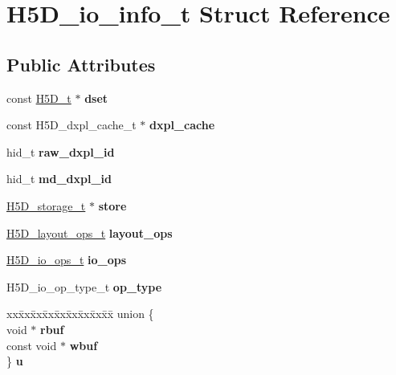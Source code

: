 \hypertarget{struct_h5_d__io__info__t}{}\section{H5\+D\+\_\+io\+\_\+info\+\_\+t Struct Reference}
\label{struct_h5_d__io__info__t}
\subsection*{Public Attributes}
\begin{DoxyCompactItemize}
\item 
\mbox{\label{struct_h5_d__io__info__t_a8b7c6ac8eb475f4453056d4341ca1df8}} 
const \hyperlink{struct_h5_d__t}{H5\+D\+\_\+t} $\ast$ {\bfseries dset}
\item 
\mbox{\label{struct_h5_d__io__info__t_ac3dbfeec55ba7855dfd26723f157e8fa}} 
const H5\+D\+\_\+dxpl\+\_\+cache\+\_\+t $\ast$ {\bfseries dxpl\+\_\+cache}
\item 
\mbox{\label{struct_h5_d__io__info__t_ab54d362d586ad62cff73ab5e09651e67}} 
hid\+\_\+t {\bfseries raw\+\_\+dxpl\+\_\+id}
\item 
\mbox{\label{struct_h5_d__io__info__t_aadc51424677ceab49a4a15b6a3f9fa3e}} 
hid\+\_\+t {\bfseries md\+\_\+dxpl\+\_\+id}
\item 
\mbox{\label{struct_h5_d__io__info__t_afe23489d1ca0a27d237cc9979565072d}} 
\hyperlink{union_h5_d__storage__t}{H5\+D\+\_\+storage\+\_\+t} $\ast$ {\bfseries store}
\item 
\mbox{\label{struct_h5_d__io__info__t_ae28ab3be23ff83b84b436795d85a0b62}} 
\hyperlink{struct_h5_d__layout__ops__t}{H5\+D\+\_\+layout\+\_\+ops\+\_\+t} {\bfseries layout\+\_\+ops}
\item 
\mbox{\label{struct_h5_d__io__info__t_aebb7b4d02dc694d9af09b7fedba888aa}} 
\hyperlink{struct_h5_d__io__ops__t}{H5\+D\+\_\+io\+\_\+ops\+\_\+t} {\bfseries io\+\_\+ops}
\item 
\mbox{\label{struct_h5_d__io__info__t_a1b5d18a63c2daddcdc762613de959eb7}} 
H5\+D\+\_\+io\+\_\+op\+\_\+type\+\_\+t {\bfseries op\+\_\+type}
\item 
\mbox{\label{struct_h5_d__io__info__t_a4a622092dfb8f81d1f1212868f73c775}} 
\begin{tabbing}
xx\=xx\=xx\=xx\=xx\=xx\=xx\=xx\=xx\=\kill
union \{\\
\>void $\ast$ {\bfseries rbuf}\\
\>const void $\ast$ {\bfseries wbuf}\\
\} {\bfseries u}\\


\end{tabbing}
\end{DoxyCompactItemize}
